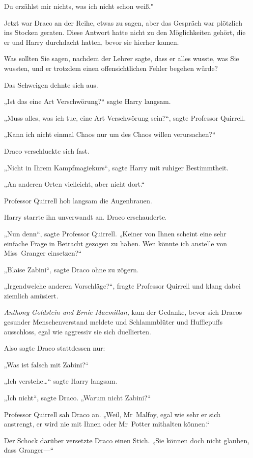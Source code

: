 {Du erzählst mir nichts, was ich nicht schon weiß."

Jetzt war Draco an der Reihe, etwas zu sagen, aber das Gespräch war plötzlich ins Stocken geraten. Diese Antwort hatte nicht zu den Möglichkeiten gehört, die er und Harry durchdacht hatten, bevor sie hierher kamen.

Was sollten Sie sagen, nachdem der Lehrer sagte, dass er alles wusste, was Sie wussten, und er trotzdem einen offensichtlichen Fehler begehen würde?

Das Schweigen dehnte sich aus.

„Ist das eine Art Verschwörung?“ sagte Harry langsam.

„Muss alles, was ich tue, eine Art Verschwörung sein?“, sagte Professor Quirrell.

„Kann ich nicht einmal Chaos nur um des Chaos willen verursachen?“

Draco verschluckte sich fast.

„Nicht in Ihrem Kampfmagiekurs“, sagte Harry mit ruhiger Bestimmtheit.

„An anderen Orten vielleicht, aber nicht dort.“

Professor Quirrell hob langsam die Augenbrauen.

Harry starrte ihn unverwandt an. Draco erschauderte.

„Nun denn“, sagte Professor Quirrell. „Keiner von Ihnen scheint eine sehr einfache Frage in Betracht gezogen zu haben. Wen könnte ich anstelle von Miss~Granger einsetzen?“

„Blaise Zabini“, sagte Draco ohne zu zögern.

„Irgendwelche anderen Vorschläge?“, fragte Professor Quirrell und klang dabei ziemlich amüsiert.

\emph{Anthony Goldstein und Ernie Macmillan,} kam der Gedanke, bevor sich Dracos gesunder Menschenverstand meldete und Schlammblüter und Hufflepuffs ausschloss, egal wie aggressiv sie sich duellierten.

Also sagte Draco stattdessen nur:

„Was ist falsch mit Zabini?“

„Ich verstehe…“ sagte Harry langsam.

„Ich nicht“, sagte Draco. „Warum nicht Zabini?“

Professor Quirrell sah Draco an. „Weil, Mr~Malfoy, egal wie sehr er sich anstrengt, er wird nie mit Ihnen oder Mr~Potter mithalten können.“

Der Schock darüber versetzte Draco einen Stich. „Sie können doch nicht glauben, dass Granger—“

}
